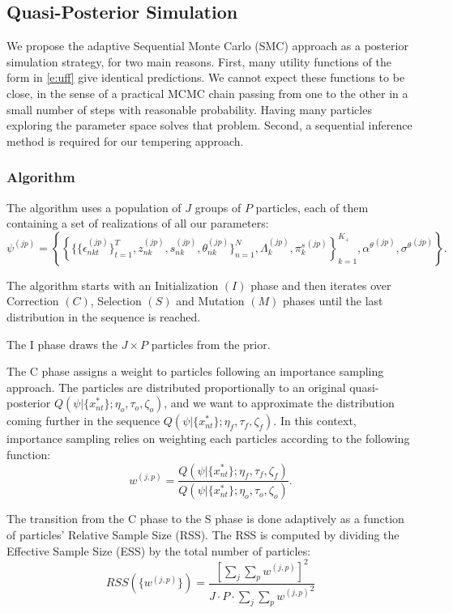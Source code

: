\documentclass[12pt]{article}
\newcounter{thm}[section]
\begin{document}
\subsection{Quasi-Posterior Simulation}

We propose the adaptive Sequential Monte Carlo (SMC) approach \citep{DurhamGeweke2014adaptive} as a posterior simulation strategy, for two main reasons.
First, many utility functions of the form in \eqref{e:uff} give identical predictions.
We cannot expect these functions to be close, in the sense of a practical MCMC chain passing from one to the other in a small number of steps with reasonable probability. Having many particles exploring the parameter space solves that problem.
Second, a sequential inference method is required for our tempering approach.


\subsubsection{Algorithm}

The algorithm uses a population of $J$ groups of $P$ particles, each of them containing a set of realizations of all our parameters: $$\psi^{(jp)} = \left\{ \left\{ \{\{\epsilon_{nkt}^{(jp)}\}_{t=1}^T, z_{nk}^{(jp)},s_{nk}^{(jp)}, \theta_{nk}^{(jp)} \}_{n=1}^N, \Lambda_{k}^{(jp)}, {\pi_k^s}^{(jp)} \right\}_{k=1}^{K_+},{\alpha^\theta}^{(jp)}, {\sigma^\theta}^{(jp)} \right\}.$$

The algorithm starts with an Initialization $(I)$ phase and then iterates over Correction $(C)$, Selection $(S)$ and Mutation $(M)$ phases until the last distribution in the sequence is reached. 

The I phase draws the $J\times P$ particles from the prior.

The C phase assigns a weight to particles following an importance sampling approach. The particles are distributed proportionally to an original quasi-posterior $Q(\psi|\{x_{nt}^*\};\eta_o,\tau_o,\zeta_o)$, and we want to approximate the distribution coming further in the sequence $Q(\psi|\{x_{nt}^*\}; \eta_f,\tau_f,\zeta_f)$. In this context, importance sampling relies on weighting each particles according to the following function:
$$ w^{(j,p)} = \frac{Q(\psi|\{x_{nt}^*\};\eta_f,\tau_f,\zeta_f)}{Q(\psi|\{x_{nt}^*\};\eta_o,\tau_o,\zeta_o)}.$$

The transition from the C phase to the S phase is done adaptively as a function of particles' Relative Sample Size (RSS). The RSS is computed by dividing the Effective Sample Size (ESS) by the total number of particles:
$$ RSS(\{ w^{(j,p)}\}) = \frac{[\sum_j \sum_p  w^{(j,p)} ]^2}{ J \cdot P \cdot \sum_j \sum_p  {w^{(j,p)}}^2 } $$
\end{document}
